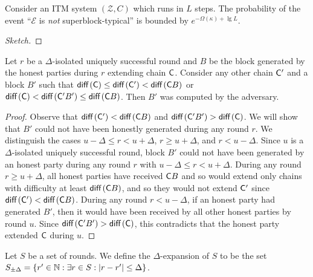 \begin{theorem}
  Consider an ITM system $(\mathcal{Z}, C)$ which runs in $L$ steps.
  The probability of the event ``$\mathcal{E}$ is \emph{not}
  superblock-typical'' is bounded by $e^{-\Omega(\kappa) + \lg{L}}$.
\end{theorem}
\begin{proof}[Sketch]
\end{proof}

\begin{lemma}[Pairing]\label{lem:pairing}
  Let $r$ be a $\Delta$-isolated uniquely successful round and $B$ be the block
  generated by the honest parties during $r$ extending chain $\mathsf{C}$. Consider
  any other chain $\mathsf{C}'$ and a block $B'$ such that
  $\operatorname{\textsf{diff}\,}(\mathsf{C}) \leq \operatorname{\textsf{diff}\,}(\mathsf{C}') < \operatorname{\textsf{diff}\,}(\mathsf{C} B)$
  or
  $\operatorname{\textsf{diff}\,}(\mathsf{C}) < \operatorname{\textsf{diff}\,}(\mathsf{C}' B') \leq \operatorname{\textsf{diff}\,}(\mathsf{C} B)$.
  Then $B'$ was computed by the adversary.
\end{lemma}
\begin{proof}
  Observe that $\operatorname{\textsf{diff}\,}(\mathsf{C}') < \operatorname{\textsf{diff}\,}(\mathsf{C} B)$
  and $\operatorname{\textsf{diff}\,}(\mathsf{C}' B') > \operatorname{\textsf{diff}\,}(\mathsf{C})$.
  We will show that $B'$ could not have been honestly generated during any
  round $r$. We distinguish the cases $u - \Delta \leq r < u + \Delta$,
  $r \geq u + \Delta$, and $r < u - \Delta$.
  Since $u$ is a $\Delta$-isolated uniquely successful round, block $B'$ could
  not have been generated by an honest party during any round $r$ with
  $u - \Delta \leq r < u + \Delta$.
  During any round $r \geq u + \Delta$, all honest parties have received
  $\mathsf{C} B$ and so would extend only chains with difficulty at least
  $\operatorname{\textsf{diff}\,}(\mathsf{C} B)$, and so they would not extend $\mathsf{C}'$ since
  $\operatorname{\textsf{diff}\,}(\mathsf{C}') < \operatorname{\textsf{diff}\,}(\mathsf{C} B)$.
  During any round $r < u - \Delta$, if an honest party had generated $B'$, then
  it would have been received by all other honest parties by round $u$.
  Since $\operatorname{\textsf{diff}\,}(\mathsf{C}' B') > \operatorname{\textsf{diff}\,}(\mathsf{C})$, this contradicts that the honest
  party extended $\mathsf{C}$ during $u$.
\end{proof}

\begin{definition}
  Let $S$ be a set of rounds. We define the $\Delta$-expansion of $S$ to be the set
  $S_{\pm\Delta} = \{r' \in \mathbb{N}: \exists r \in S: |r - r'| \leq \Delta\}$.
\end{definition}


